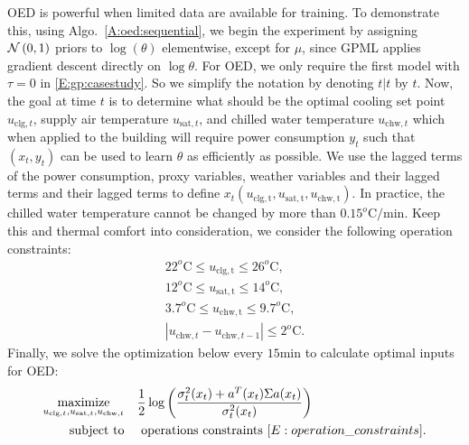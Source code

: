 OED is powerful when limited data are available for training. 
To demonstrate this, using Algo.~\ref{A:oed:sequential}, we begin the experiment by assigning \(\operatorname*{\mathcal{N}}\left(0, 1\right)\) priors to \(\log (\theta) \) elementwise, except for \(\mu\), since GPML applies gradient descent directly on \(\log \theta\).
For OED, we only require the first model with \(\tau=0\) in \eqref{E:gp:casestudy}. So we simplify the notation by denoting \(t|t\) by \(t\).
Now, the goal at time \(t\) is to determine what should be the optimal cooling set point \(u_{\mathrm{clg},t}\), supply air temperature \(u_{\mathrm{sat},t}\), and chilled water temperature \(u_{\mathrm{chw},t}\) which when applied to the building will require power consumption \(y_t\) such that \((x_t,y_t)\) can be used to learn \(\theta\) as efficiently as possible.
We use the lagged terms of the power consumption, proxy variables, weather variables and their lagged terms and their lagged terms to define \(x_t(u_{\mathrm{clg,t}},u_{\mathrm{sat,t}},u_{\mathrm{chw,t}})\).
In practice, the chilled water temperature cannot be changed by more than \(0.15^o\mathrm{C/min}\). Keep this and thermal comfort into consideration, we consider the following operation constraints:
\begin{gather}
22^o\mathrm{C} \leq u_{\mathrm{clg,t}} \leq  26^o\mathrm{C}, \nonumber \\
12^o\mathrm{C} \leq u_{\mathrm{sat,t}} \leq  14^o\mathrm{C}, \nonumber \\
 3.7^o\mathrm{C} \leq u_{\mathrm{chw,t}} \leq  9.7^o\mathrm{C},\label{E:operation_constraints} \\
| u_{\mathrm{chw},t} - u_{\mathrm{chw},t-1}| \leq  2^o\mathrm{C}. \nonumber
\end{gather}
Finally, we solve the optimization below every \(15 \mathrm{min}\) to calculate optimal inputs for OED:
\begin{align}
\label{E:casestudy:oed}
\maximize_{u_{\mathrm{clg},t},u_{\mathrm{sat},t},u_{\mathrm{chw},t}} & \ \ \ \frac{1}{2}\log\left(\frac{\sigma^2_{t}(x_t)+a^T(x_t)\Sigma a(x_t)}{\sigma^2_{t}(x_t)}\right) \\
\st &  \ \ \ \  \text{operations constraints } \eqref{E:operation_constraints}.\nonumber
\end{align}

